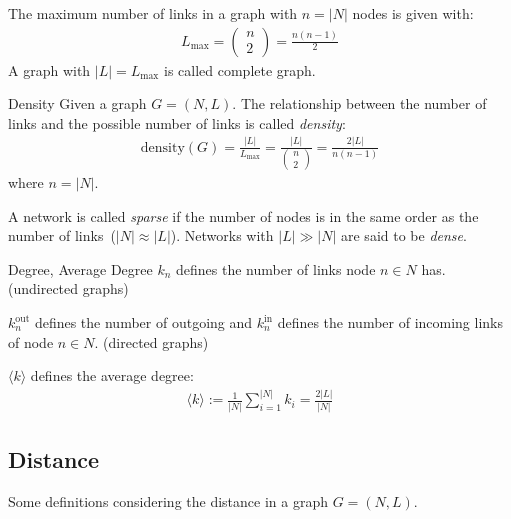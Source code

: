 \documentclass[english]{panikzettel}
\begin{document}
The maximum number of links in a graph with $ n = |N| $ nodes is given with: \label{sec:max_number_links}
\begin{align*}
	L_\text{max} = \left(\begin{array}{c}
	n\\ 2
	\end{array}\right) = \frac{n (n-1)}{2}
\end{align*}
A graph with $ |L| = L_\text{max} $ is called complete graph.

\begin{halfboxl}
	\begin{defi}{Density}
		Given a graph $ G = (N,L) $. 
		The relationship between the number of links and the possible number of links is called \textit{density}:
		\begin{align*}
		\text{density}(G) = \frac{|L|}{L_\text{max}} = \frac{|L|}{\left(\begin{array}{c}
			n\\ 2
			\end{array}\right)} = \frac{2 |L|}{n (n-1)}
		\end{align*}
		where $ n = |N| $.
		
		A network is called \textit{sparse} if the number of nodes is in the same order as the number of links~($ |N| \approx |L| $). 
		Networks with $ |L| \gg |N| $ are said to be \textit{dense}.
	\end{defi}
\end{halfboxl}
\begin{halfboxr}
	\begin{defi}{Degree, Average Degree}
		$ k_n $ defines the number of links node $ n \in N $ has. (undirected graphs)
		
		$ k^\text{out}_n $ defines the number of outgoing and $ k^\text{in}_n $ defines the number of incoming links of node $ n \in N $. (directed graphs)
		
		$ \langle k \rangle $ defines the average degree:
		\begin{align*}
			\langle k \rangle := \frac{1}{|N|} \sum\limits_{i=1}^{|N|} k_i = \frac{2 |L|}{|N|}
		\end{align*}		
	\end{defi}
\end{halfboxr}

\subsection{Distance}\label{sec:distance}
Some definitions considering the distance in a graph $ G = (N,L) $.
\end{document}
